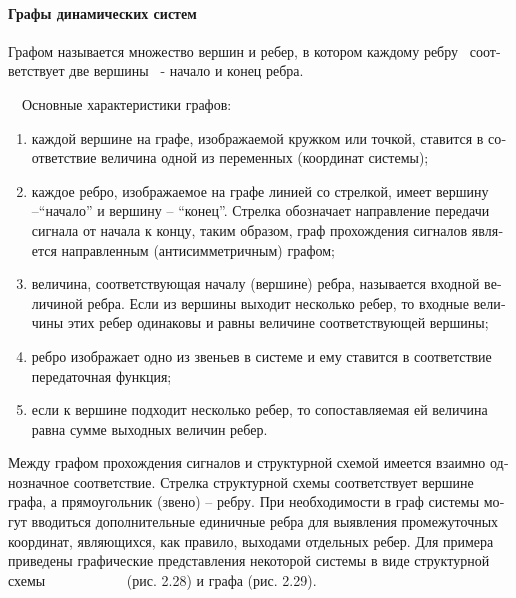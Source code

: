 \documentclass[a4paper]{article}
\newcommand\liststyleWWviiiNumi{%
\renewcommand\theenumi{\arabic{enumi}}
\renewcommand\theenumii{\arabic{enumii}}
\renewcommand\theenumiii{\arabic{enumiii}}
\renewcommand\theenumiv{\arabic{enumiv}}
\renewcommand\labelenumi{\theenumi)}
\renewcommand\labelenumii{\theenumii.}
\renewcommand\labelenumiii{\theenumiii.}
\renewcommand\labelenumiv{\theenumiv.}
}
\begin{document}
\paragraph{Графы динамических систем}
{\begin{russian}\sffamily
Графом называется множество вершин и ребер, в котором каждому ребру \ соответствует две вершины \ - начало и конец
ребра.
\end{russian}}

{\begin{russian}\sffamily
\ \ Основные характеристики графов:
\end{russian}}

\liststyleWWviiiNumi
\begin{enumerate}
\item {\begin{russian}\sffamily
каждой вершине на графе, изображаемой кружком или точкой, ставится в соответствие величина одной из переменных
(координат системы);
\end{russian}}
\item {\begin{russian}\sffamily
каждое ребро, изображаемое на графе линией со стрелкой, имеет вершину –“начало” и вершину – “конец”. Стрелка обозначает
направление передачи сигнала от начала к концу, таким образом, граф прохождения сигналов является направленным
(антисимметричным) графом;
\end{russian}}
\item {\begin{russian}\sffamily
величина, соответствующая началу (вершине) ребра, называется входной величиной ребра. Если из вершины выходит несколько
ребер, то входные величины этих ребер одинаковы и равны величине соответствующей вершины;
\end{russian}}
\item {\begin{russian}\sffamily
ребро изображает одно из звеньев в системе и ему ставится в соответствие передаточная функция;
\end{russian}}
\item {\begin{russian}\sffamily
если к вершине подходит несколько ребер, то сопоставляемая ей величина равна сумме выходных величин ребер.
\end{russian}}
\end{enumerate}

\bigskip

{\begin{russian}\sffamily
Между графом прохождения сигналов и структурной схемой имеется взаимно однозначное соответствие. Стрелка структурной
схемы соответствует вершине графа, а прямоугольник (звено) – ребру. При необходимости в граф системы могут вводиться
дополнительные единичные ребра для выявления промежуточных координат, являющихся, как правило, выходами отдельных
ребер. Для примера приведены графические представления некоторой системы в виде структурной схемы
\ \ \ \ \ \ \ \ \ \ \ (рис. 2.28) и графа (рис. 2.29).
\end{russian}}
\end{document}
